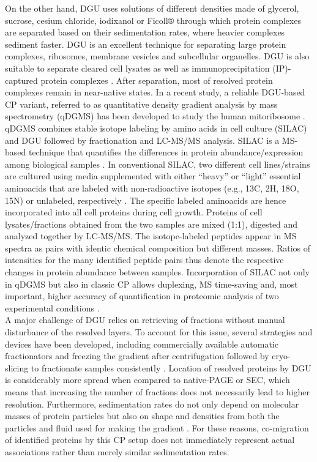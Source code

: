 On the other hand, DGU uses solutions of different densities made of glycerol, sucrose, cesium chloride, iodixanol or Ficoll® through which protein complexes are separated based on their sedimentation rates, where heavier complexes sediment faster. DGU is an excellent technique for separating large protein complexes, ribosomes, membrane vesicles and subcellular organelles. DGU is also suitable to separate cleared cell lysates as well as immunoprecipitation (IP)-captured protein complexes \cite{Caudron-Herger_2019, Lee_2013}. After separation, most of resolved protein complexes remain in near-native states. In a recent study, a reliable DGU-based CP variant, referred to as quantitative density gradient analysis by mass spectrometry (qDGMS) has been developed to study the human mitoribosome \cite{Palenikova_2021a}. qDGMS combines stable isotope labeling by amino acids in cell culture (SILAC) and DGU followed by fractionation and LC-MS/MS analysis. SILAC is a MS-based technique that quantifies the differences in protein abundance/expression among biological samples \cite{Ong_2002}. In conventional SILAC, two different cell lines/strains are cultured using media supplemented with either “heavy” or “light” essential aminoacids that are labeled with non-radioactive isotopes (e.g., 13C, 2H, 18O, 15N) or unlabeled, respectively \cite{Geiger_2011}. The specific labeled aminoacids are hence incorporated into all cell proteins during cell growth. Proteins of cell lysates/fractions obtained from the two samples are mixed (1:1), digested and analyzed together by LC-MS/MS. The isotope-labeled peptides appear in MS spectra as pairs with identic chemical composition but different masses. Ratios of intensities for the many identified peptide pairs thus denote the respective changes in protein abundance between samples. Incorporation of SILAC not only in qDGMS but also in classic CP allows duplexing, MS time-saving and, most important, higher accuracy of quantification in proteomic analysis of two experimental conditions \cite{Palenikova_2021a, Palenikova_2021b}.\\
A major challenge of DGU relies on retrieving of fractions without manual disturbance of the resolved layers. To account for this issue, several strategies and devices have been developed, including commercially available automatic fractionators and freezing the gradient after centrifugation followed by cryo-slicing to fractionate samples consistently \cite{Yu_2016}. Location of resolved proteins by DGU is considerably more spread when compared to native-PAGE or SEC, which means that increasing the number of fractions does not necessarily lead to higher resolution. Furthermore, sedimentation rates do not only depend on molecular masses of protein particles but also on shape and densities from both the particles and fluid used for making the gradient \cite{Cole_2008}. For these reasons, co-migration of identified proteins by this CP setup does not immediately represent actual associations rather than merely similar sedimentation rates.

